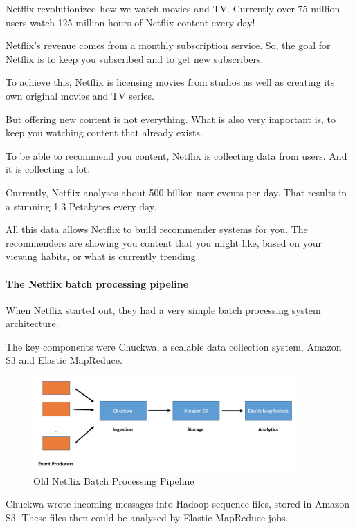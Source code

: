 \documentclass[12pt, numbers=noenddot]{scrreprt} %
\begin{document}
Netflix revolutionized how we watch movies and TV. Currently over 75 million users watch 125 million hours of Netflix content every day!

Netflix’s revenue comes from a monthly subscription service. So, the goal for Netflix is to keep you subscribed and to get new subscribers.

To achieve this, Netflix is licensing movies from studios as well as creating its own original movies and TV series.

But offering new content is not everything. What is also very important is, to keep you watching content that already exists.

To be able to recommend you content, Netflix is collecting data from users. And it is collecting a lot.

Currently, Netflix analyses about 500 billion user events per day. That results in a stunning 1.3 Petabytes every day.

All this data allows Netflix to build recommender systems for you. The recommenders are showing you content that you might like, based on your viewing habits, or what is currently trending.

\paragraph{The Netflix batch processing pipeline}
When Netflix started out, they had a very simple batch processing system architecture.

The key components were Chuckwa, a scalable data collection system, Amazon S3 and Elastic MapReduce.

\begin{figure}[htbp]
  \centering
     \includegraphics[width=0.9\textwidth]{images/Netflix-Chuckwa-Pipeline.png}
  \caption{Old Netflix Batch Processing Pipeline}
  \label{fig:Bild1}
\end{figure}

Chuckwa wrote incoming messages into Hadoop sequence files, stored in Amazon S3. These files then could be analysed by Elastic MapReduce jobs.
\end{document}
